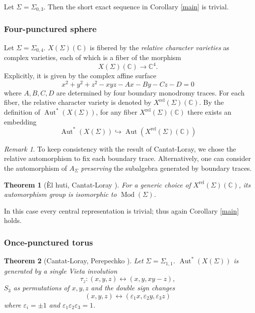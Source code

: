 \documentclass[11pt]{amsart}
\newtheorem{theorem}{Theorem}
\numberwithin{theorem}{section}
\theoremstyle{definition}
\theoremstyle{remark}
\newtheorem*{remark}{Remark}
\newcommand{\C}{{\mathbb{C}}}
\DeclareMathOperator{\Aut}{Aut}
\DeclareMathOperator{\Mod}{Mod}
\newcommand{\<}{\langle}
\renewcommand{\>}{\rangle}
\begin{document}
Let $\Sigma = \Sigma_{0,3}$. Then the short exact sequence in Corollary \ref{main} is trivial.

\subsubsection{Four-punctured sphere}

Let $\Sigma = \Sigma_{0,4}$. $X(\Sigma)(\C)$ is fibered by the \textit{relative character varieties} as complex varieties, each of which is a fiber of the morphism
\[
X(\Sigma)(\C) \rightarrow \C^4.
\]
Explicitly, it is given by the complex affine surface
\[
x^2 + y^2 + z^2 - xyz - Ax - By - Cz - D = 0
\]
where $A, B, C, D$ are determined by four boundary monodromy traces. For each fiber, the relative character variety is denoted by $X^{\textrm{rel}}(\Sigma)(\C)$. By the definition of $\Aut^*(X(\Sigma))$, for any fiber $X^{\textrm{rel}}(\Sigma)(\C)$ there exists an embedding
\[
\Aut^*(X(\Sigma))  \hookrightarrow \Aut(X^\textrm{rel}(\Sigma)(\C))
\]


\begin{remark}
To keep consistency with the result of Cantat-Loray, we chose the relative automorphism to fix each boundary trace. Alternatively, one can consider the automorphism of $A_\Sigma$ \textit{preserving} the subalgebra generated by boundary traces.
\end{remark}


\begin{theorem}[\`El huti, Cantat-Loray \cite{el1974cubic}\cite{cantat2007holomorphic}]
    For a generic choice of $X^{\mathrm{rel}}(\Sigma)(\C)$, its automorphism group is isomorphic to $\Mod(\Sigma)$. 
\end{theorem}

In this case every central representation is trivial; thus again Corollary \ref{main} holds.

\subsubsection{Once-punctured torus}

\begin{theorem}[Cantat-Loray, Perepechko \cite{cantat2007holomorphic}\cite{perepechko2021automorphisms}]
    Let $\Sigma = \Sigma_{1,1}$. $\Aut^*(X(\Sigma))$ is generated by a single Vieta involution
    \[
    \tau_z : (x, y, z) \leftrightarrow (x, y, xy-z),
    \]
    $S_3$ as permutations of $x, y, z$ and the double sign changes
    \[
    (x, y, z) \leftrightarrow (\varepsilon_1 x,  \varepsilon_2 y, \varepsilon_3 z)
    \]
    where $\varepsilon_i = \pm 1$ and $\varepsilon_1 \varepsilon_2 \varepsilon_3 = 1$.
\end{theorem}
\end{document}
